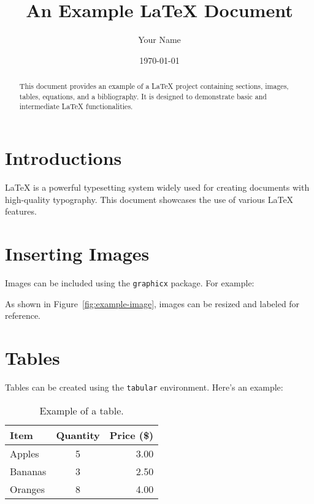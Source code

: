 \documentclass[a4paper,12pt]{article}
\title{An Example LaTeX Document}
\author{Your Name}
\date{\today}
\begin{document}
\maketitle

\begin{abstract}
This document provides an example of a LaTeX project containing sections, images, tables, equations, and a bibliography. It is designed to demonstrate basic and intermediate LaTeX functionalities.
\end{abstract}

\tableofcontents
\newpage

\section{Introductions}
LaTeX is a powerful typesetting system widely used for creating documents with high-quality typography. This document showcases the use of various LaTeX features.

\section{Inserting Images}
Images can be included using the \texttt{graphicx} package. For example:

 

As shown in Figure~\ref{fig:example-image}, images can be resized and labeled for reference.

\section{Tables}
Tables can be created using the \texttt{tabular} environment. Here's an example:

\begin{table}[h!]
    \centering
    \begin{tabular}{|l|c|r|}
    \hline
    \textbf{Item} & \textbf{Quantity} & \textbf{Price (\$)} \\ \hline
    Apples        & 5                 & 3.00               \\ \hline
    Bananas       & 3                 & 2.50               \\ \hline
    Oranges       & 8                 & 4.00               \\ \hline
    \end{tabular}
    \caption{Example of a table.}
    \label{tab:example-table}
\end{table}
\end{document}
